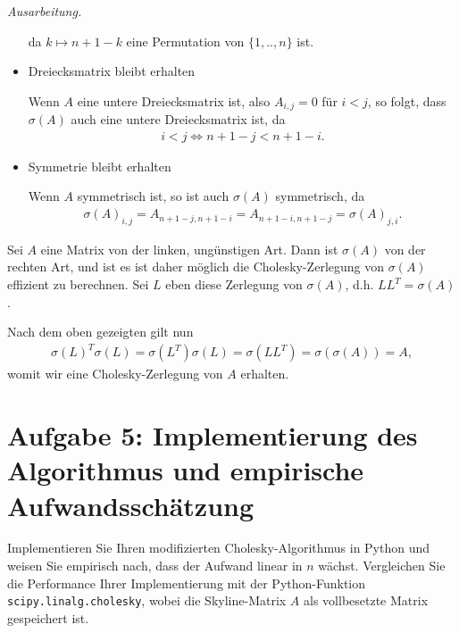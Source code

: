 \documentclass[]{article}
\newenvironment{ausarbeitung}{\vspace{3mm}\noindent\textit{Ausarbeitung.}}{}
\begin{document}
\begin{ausarbeitung}
\begin{itemize}
			da $k \mapsto n+1-k$ eine Permutation von $\{1, .., n\}$ ist.
		\item Dreiecksmatrix bleibt erhalten
		
		Wenn $A$ eine untere Dreiecksmatrix ist, also $A_{i,j} = 0$ für $i < j$, so folgt, dass $\sigma(A)$ auch eine untere Dreiecksmatrix ist, da 
		\begin{align*}
			i < j \iff n+1-j < n+1-i.
		\end{align*}
		
		\item Symmetrie bleibt erhalten
		
		Wenn $A$ symmetrisch ist, so ist auch $\sigma(A)$ symmetrisch, da 
		\begin{align*}
			\sigma(A)_{i,j} = A_{n+1-j,n+1-i} = A_{n+1-i,n+1-j} = \sigma(A)_{j,i}.
		\end{align*}
	\end{itemize}

	Sei $A$ eine Matrix von der linken, ungünstigen Art. Dann ist $\sigma(A)$ von der rechten Art, und ist es ist daher möglich die Cholesky-Zerlegung von $\sigma(A)$ effizient zu berechnen. Sei $L$ eben diese Zerlegung von $\sigma(A)$, d.h. $LL^T=\sigma(A)$.
	
	Nach dem oben gezeigten gilt nun
	\begin{align*}
		\sigma(L)^T\sigma(L) = \sigma(L^T)\sigma(L) = \sigma(LL^T) = \sigma(\sigma(A)) = A,
	\end{align*}
	womit wir eine Cholesky-Zerlegung von $A$ erhalten.
\end{ausarbeitung}
\newpage



\section*{Aufgabe 5: Implementierung des Algorithmus und empirische Aufwandsschätzung}
Implementieren Sie Ihren modifizierten Cholesky-Algorithmus in Python und weisen Sie empirisch nach, dass der Aufwand linear in $n$ wächst. Vergleichen Sie die Performance Ihrer Implementierung mit der Python-Funktion \texttt{scipy.linalg.cholesky}, wobei die Skyline-Matrix $A$ als vollbesetzte Matrix gespeichert ist.
\end{document}
